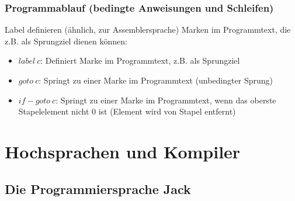 \documentclass[12pt]{report}
\begin{document}
\subsection{Programmablauf (bedingte Anweisungen und Schleifen)}
Label definieren (ähnlich, zur Assemblersprache) Marken im Programmtext, die z.B. als Sprungziel dienen können:

\begin{itemize}
  \item $label\ c$: Definiert Marke im Programmtext, z.B. als Sprungziel
  \item $goto\ c$: Springt zu einer Marke im Programmtext (unbedingter Sprung)
  \item $if-goto\ c$: Springt zu einer Marke im Programmtext, wenn das oberste Stapelelement nicht $0$ ist (Element wird von Stapel entfernt)
\end{itemize}



\chapter{Hochsprachen und Kompiler}

\section{Die Programmiersprache Jack}
\end{document}

